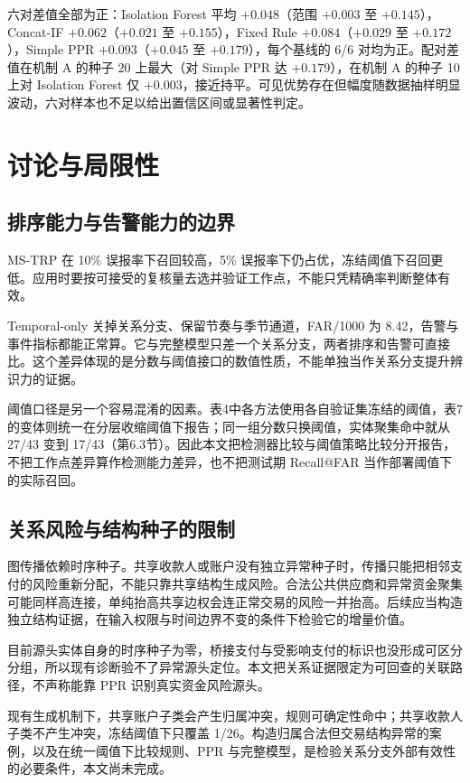 \documentclass[a4paper,fleqn]{cas-dc}
\begin{document}
六对差值全部为正：Isolation Forest 平均 $+0.048$（范围 $+0.003$ 至 $+0.145$），Concat-IF $+0.062$（$+0.021$ 至 $+0.155$），Fixed Rule $+0.084$（$+0.029$ 至 $+0.172$），Simple PPR $+0.093$（$+0.045$ 至 $+0.179$），每个基线的 6/6 对均为正。配对差值在机制 A 的种子 20 上最大（对 Simple PPR 达 $+0.179$），在机制 A 的种子 10 上对 Isolation Forest 仅 $+0.003$，接近持平。可见优势存在但幅度随数据抽样明显波动，六对样本也不足以给出置信区间或显著性判定。

\section{讨论与局限性}
\subsection{排序能力与告警能力的边界}
MS-TRP 在 10\% 误报率下召回较高，5\% 误报率下仍占优，冻结阈值下召回更低。应用时要按可接受的复核量去选并验证工作点，不能只凭精确率判断整体有效。

Temporal-only 关掉关系分支、保留节奏与季节通道，FAR/1000 为 8.42，告警与事件指标都能正常算。它与完整模型只差一个关系分支，两者排序和告警可直接比。这个差异体现的是分数与阈值接口的数值性质，不能单独当作关系分支提升辨识力的证据。

阈值口径是另一个容易混淆的因素。表4中各方法使用各自验证集冻结的阈值，表7的变体则统一在分层收缩阈值下报告；同一组分数只换阈值，实体聚集命中就从 27/43 变到 17/43（第6.3节）。因此本文把检测器比较与阈值策略比较分开报告，不把工作点差异算作检测能力差异，也不把测试期 Recall@FAR 当作部署阈值下的实际召回。

\subsection{关系风险与结构种子的限制}
图传播依赖时序种子。共享收款人或账户没有独立异常种子时，传播只能把相邻支付的风险重新分配，不能只靠共享结构生成风险。合法公共供应商和异常资金聚集可能同样高连接，单纯抬高共享边权会连正常交易的风险一并抬高。后续应当构造独立结构证据，在输入权限与时间边界不变的条件下检验它的增量价值。

目前源头实体自身的时序种子为零，桥接支付与受影响支付的标识也没形成可区分分组，所以现有诊断验不了异常源头定位。本文把关系证据限定为可回查的关联路径，不声称能靠 PPR 识别真实资金风险源头。

现有生成机制下，共享账户子类会产生归属冲突，规则可确定性命中；共享收款人子类不产生冲突，冻结阈值下只覆盖 1/26。构造归属合法但交易结构异常的案例，以及在统一阈值下比较规则、PPR 与完整模型，是检验关系分支外部有效性的必要条件，本文尚未完成。
\end{document}
